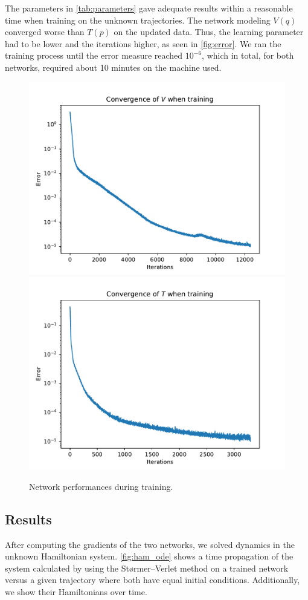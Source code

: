 \documentclass{article}
\begin{document}
The parameters in \autoref{tab:parameters} gave adequate results within a reasonable time when training on the unknown trajectories. The network modeling $V(q)$ converged worse than $T(p)$ on the updated data. Thus, the learning parameter had to be lower and the iterations higher, as seen in \autoref{fig:error}. We ran the training process until the error measure reached $10^{-6}$, which in total, for both networks, required about 10 minutes on the machine used.

\begin{figure}[h!]
    \centering
    \includegraphics[width=.8\linewidth]{V_convergence.pdf}
    \includegraphics[width=.8\linewidth]{T_convergence.pdf}
    \caption{Network performances during training.}
    \label{fig:error}
\end{figure}

\subsection{Results}
After computing the gradients of the two networks, we solved dynamics in the unknown Hamiltonian system. \autoref{fig:ham_ode} shows a time propagation of the system calculated by using the Størmer--Verlet method on a trained network versus a given trajectory where both have equal initial conditions. Additionally, we show their Hamiltonians over time.
\end{document}
